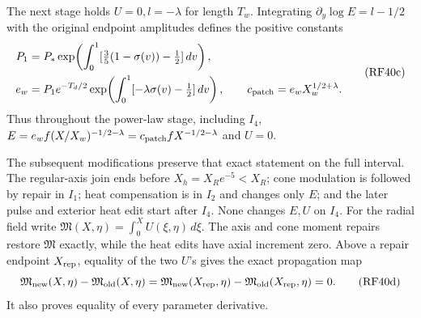\documentclass[10pt,a4paper]{article}
\begin{document}
The next stage holds \(U=0,l=-\lambda\) for length \(T_w\).
Integrating \(\partial_y\log E=l-1/2\) with the original endpoint
amplitudes defines the positive constants
\[
\begin{split}
P_1&=P_*\exp\!\left(\int_0^1
[\tfrac35(1-\sigma(v))-\tfrac12]\,dv\right),\\
e_w&=P_1e^{-T_d/2}
\exp\!\left(\int_0^1[-\lambda\sigma(v)-\tfrac12]\,dv\right),\qquad
c_{\rm patch}=e_wX_w^{1/2+\lambda}.
\end{split}
\tag{RF40c}
\]
Thus throughout the power-law stage, including \(I_4\),
\(E=e_wf(X/X_w)^{-1/2-\lambda}
=c_{\rm patch}fX^{-1/2-\lambda}\) and \(U=0\).

The subsequent modifications preserve that exact statement on the full
interval. The regular-axis join ends before \(X_h=X_Re^{-5}<X_R\);
cone modulation is followed by repair in \(I_1\); heat compensation
is in \(I_2\) and changes only \(E\); and the later pulse and
exterior heat edit start after \(I_4\). None changes \(E,U\) on
\(I_4\). For the radial field write
\(\mathfrak M(X,\eta)=\int_0^XU(\xi,\eta)\,d\xi\).
The axis and cone moment repairs restore \(\mathfrak M\) exactly,
while the heat edits have axial increment zero. Above a repair
endpoint \(X_{\rm rep}\), equality of the two \(U\)'s gives the
exact propagation map
\[
\mathfrak M_{\rm new}(X,\eta)-\mathfrak M_{\rm old}(X,\eta)
=\mathfrak M_{\rm new}(X_{\rm rep},\eta)
-\mathfrak M_{\rm old}(X_{\rm rep},\eta)=0.
\tag{RF40d}
\]
It also proves equality of every parameter derivative.
\end{document}
